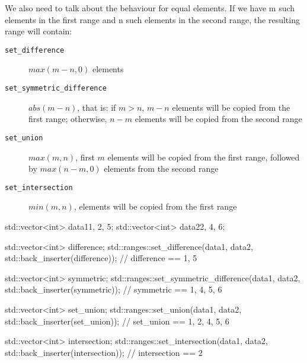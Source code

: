 We also need to talk about the behaviour for equal elements. If we have m such elements in the first range and n such elements in the second range, the resulting range will contain:


\begin{description}
   \item[\texttt{set\_difference}] $max(m-n,0)$ elements
   \item[\texttt{set\_symmetric\_difference}] $abs(m-n)$, that is: if $m>n$, $m-n$ elements will be copied from the first range; otherwise, $n-m$ elements will be copied from the second range
   \item[\texttt{set\_union}] $max(m,n)$, first $m$ elements will be copied from the first range, followed by $max(n-m,0)$ elements from the second range
   \item[\texttt{set\_intersection}] $min(m,n)$, elements will be copied from the first range
\end{description}

\begin{box-note}
\begin{cppcode}
std::vector<int> data1{1, 2, 5};
std::vector<int> data2{2, 4, 6};

std::vector<int> difference;
std::ranges::set_difference(data1, data2, std::back_inserter(difference));
// difference == {1, 5}

std::vector<int> symmetric;
std::ranges::set_symmetric_difference(data1, data2, std::back_inserter(symmetric));
// symmetric == {1, 4, 5, 6}

std::vector<int> set_union;
std::ranges::set_union(data1, data2, std::back_inserter(set_union));
// set_union == {1, 2, 4, 5, 6}

std::vector<int> intersection;
std::ranges::set_intersection(data1, data2, std::back_inserter(intersection));
// intersection == {2}
\end{cppcode}
\end{box-note}